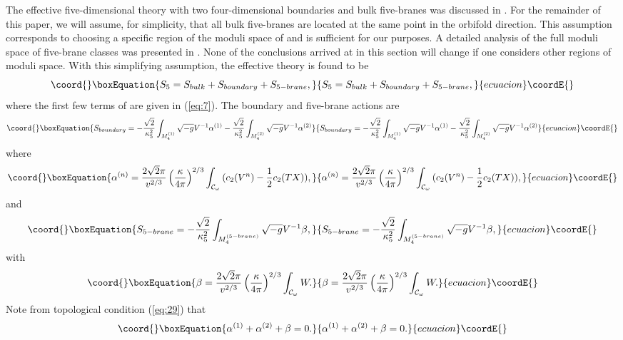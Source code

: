 \documentclass[a4paper,12pt]{article}
\numberwithin{equation}{section}
\theoremstyle{plain}
\begin{document}
The effective five-dimensional theory with two four-dimensional boundaries and
\coordHE{} bulk five-branes was discussed in \cite{NSE}. 
For the remainder of this paper, we
will assume, for simplicity, that all bulk five-branes are located at the same
point in the orbifold direction. This assumption corresponds 
to choosing a specific region of
the moduli space of \coordHE{} and is sufficient for our purposes. 
A detailed analysis of the full moduli space of five-brane classes \coordHE{} was 
presented in \cite{FB}. None of the conclusions arrived 
at in this section will change
if one considers other regions of moduli space. With this simplifying
assumption, the effective theory is found to be
%
\begin{equation}\coord{}\boxEquation{
S_{5}=S_{bulk}+S_{boundary}+S_{5-brane},
\label{eq:30}
}{
S_{5}=S_{bulk}+S_{boundary}+S_{5-brane},
}{ecuacion}\coordE{}\end{equation}
%
where the first few terms of \coordHE{} are given in (\ref{eq:7}). The
boundary and five-brane actions are 
%
\begin{equation}\coord{}\boxEquation{
S_{boundary}=-\frac{\sqrt{2}}{\kappa_{5}^{2}}\int_{M_{4}^{(1)}}
{\sqrt{-g}V^{-1}\alpha^{(1)}} - \frac{\sqrt{2}}{\kappa_{5}^{2}}\int_{M_{4}^{(2)}}
{\sqrt{-g}V^{-1}\alpha^{(2)}} 
\label{eq:31}
}{
S_{boundary}=-\frac{\sqrt{2}}{\kappa_{5}^{2}}\int_{M_{4}^{(1)}}
{\sqrt{-g}V^{-1}\alpha^{(1)}} - \frac{\sqrt{2}}{\kappa_{5}^{2}}\int_{M_{4}^{(2)}}
{\sqrt{-g}V^{-1}\alpha^{(2)}} 
}{ecuacion}\coordE{}\end{equation}
%
where
%
\begin{equation}\coord{}\boxEquation{
\alpha^{(n)}=\frac{2\sqrt{2}\pi}{v^{2/3}}\left(\frac{\kappa}{4\pi}\right)^{2/3}
\int_{{\cal{C}}_{\omega}}{(c_{2}(V^{n})-\frac{1}{2}c_{2}(TX))},
\label{eq:32}
}{
\alpha^{(n)}=\frac{2\sqrt{2}\pi}{v^{2/3}}\left(\frac{\kappa}{4\pi}\right)^{2/3}
\int_{{\cal{C}}_{\omega}}{(c_{2}(V^{n})-\frac{1}{2}c_{2}(TX))},
}{ecuacion}\coordE{}\end{equation}
%
and
%
\begin{equation}\coord{}\boxEquation{
S_{5-brane}=-\frac{\sqrt{2}}{\kappa_{5}^{2}}\int_{M_{4}^{(5-brane)}}
{\sqrt{-g}V^{-1}\beta},
\label{eq:33}
}{
S_{5-brane}=-\frac{\sqrt{2}}{\kappa_{5}^{2}}\int_{M_{4}^{(5-brane)}}
{\sqrt{-g}V^{-1}\beta},
}{ecuacion}\coordE{}\end{equation}
%
with
%
\begin{equation}\coord{}\boxEquation{
\beta=\frac{2\sqrt{2}\pi}{v^{2/3}}\left(\frac{\kappa}{4\pi}\right)^{2/3}
\int_{{\cal{C}}_{\omega}}{W}.
\label{eq:34}
}{
\beta=\frac{2\sqrt{2}\pi}{v^{2/3}}\left(\frac{\kappa}{4\pi}\right)^{2/3}
\int_{{\cal{C}}_{\omega}}{W}.
}{ecuacion}\coordE{}\end{equation}
%
Note from topological condition (\ref{eq:29}) that
%
\begin{equation}\coord{}\boxEquation{
\alpha^{(1)}+\alpha^{(2)}+\beta=0.
\label{eq:35}
}{
\alpha^{(1)}+\alpha^{(2)}+\beta=0.
}{ecuacion}\coordE{}\end{equation}
%
\end{document}
